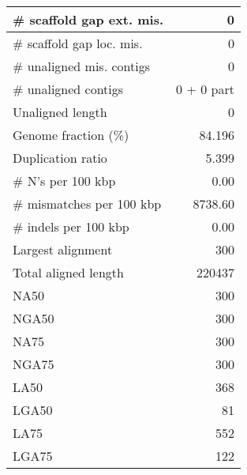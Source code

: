\documentclass[12pt,a4paper]{article}
\begin{document}
\begin{table}[ht]
\begin{center}
\begin{tabular}{|l*{1}{|r}|}
\# scaffold gap ext. mis. & 0 \\ \hline
\# scaffold gap loc. mis. & 0 \\ \hline
\# unaligned mis. contigs & 0 \\ \hline
\# unaligned contigs & 0 + 0 part \\ \hline
Unaligned length & 0 \\ \hline
Genome fraction (\%) & 84.196 \\ \hline
Duplication ratio & 5.399 \\ \hline
\# N's per 100 kbp & 0.00 \\ \hline
\# mismatches per 100 kbp & 8738.60 \\ \hline
\# indels per 100 kbp & 0.00 \\ \hline
Largest alignment & 300 \\ \hline
Total aligned length & 220437 \\ \hline
NA50 & 300 \\ \hline
NGA50 & 300 \\ \hline
NA75 & 300 \\ \hline
NGA75 & 300 \\ \hline
LA50 & 368 \\ \hline
LGA50 & 81 \\ \hline
LA75 & 552 \\ \hline
LGA75 & 122 \\ \hline
\end{tabular}
\end{center}
\end{table}
\end{document}
